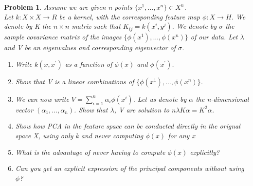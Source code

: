 \documentclass[12pt]{article}
\newtheorem{hw}{Problem}
\begin{document}
\begin{hw}\rm
Assume we are given n points $\{x^1,\dots,x^n\}\in X^n $.\\
Let $k : X \times X \rightarrow R$ be a kernel, with the corresponding feature map $\phi : X \rightarrow H$. We denote by K the $n\times n$ matrix such that $K_{ij} = k(x^i,y^j)$. We denote by $\sigma$ the sample covariance matrix of the images $\{ \phi(x^1),\dots,\phi(x^n)\}$ of our data. Let $\lambda$ and V be an eigenvalues and corresponding eigenvector of $\sigma$.
\begin{enumerate}[label=(\alph*)]
\item Write $k(x,x^{'})$ as a function of $\phi(x)$ and $\phi(x^{'})$.
\item Show that V is a linear combinations of $\{ \phi(x^1),\dots,\phi(x^n)\}$.
\item We can now write $V = \sum^n_{i=1} \alpha_i \phi(x^i)$. Let us denote by $\alpha$ the n-dimensional vector $(\alpha_1, \dots, \alpha_n)$. Show that $\lambda$, V are solution to $n\lambda K \alpha = K^2 \alpha$.
\item 
Show how PCA in the feature space can be conducted directly in the orignal space X, using only k and never computing $\phi(x)$ for any x
\item What is the advantage of never having to compute $\phi(x)$ explicitly?
\item Can you get an explicit expression of the principal components without using $\phi$?
\end{enumerate}
\end{hw}
\end{document}
